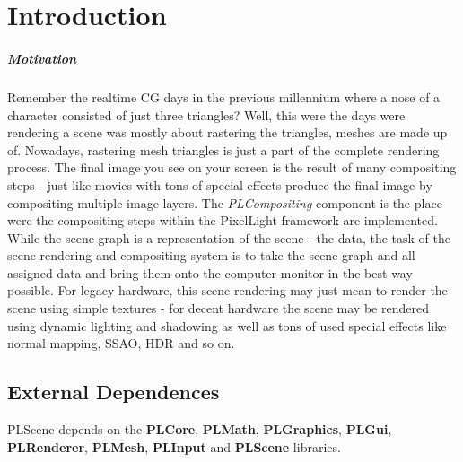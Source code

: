 \chapter{Introduction}


\paragraph{Motivation}$\;$ \\
Remember the realtime CG days in the previous millennium where a nose of a character consisted of just three triangles? Well, this were the days were rendering a scene was mostly about rastering the triangles, meshes are made up of. Nowadays, rastering mesh triangles is just a part of the complete rendering process. The final image you see on your screen is the result of many compositing steps - just like movies with tons of special effects produce the final image by compositing multiple image layers. The \emph{PLCompositing} component is the place were the compositing steps within the PixelLight framework are implemented. While the scene graph is a representation of the scene - the data, the task of the scene rendering and compositing system is to take the scene graph and all assigned data and bring them onto the computer monitor in the best way possible. For legacy hardware, this scene rendering may just mean to render the scene using simple textures - for decent hardware the scene may be rendered using dynamic lighting and shadowing as well as tons of used special effects like normal mapping, SSAO, HDR and so on.




\section{External Dependences}

PLScene depends on the \textbf{PLCore}, \textbf{PLMath}, \textbf{PLGraphics}, \textbf{PLGui}, \textbf{PLRenderer}, \textbf{PLMesh}, \textbf{PLInput} and \textbf{PLScene} libraries.
